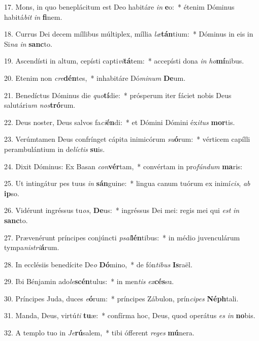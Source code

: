 17. Mons, in quo beneplácitum est Deo habitáre \textit{in} \textbf{e}o:~*  étenim Dóminus habitá\textit{bit} \textit{in} \textbf{fi}nem.\

18. Currus Dei decem míllibus múltiplex, míllia \textit{læ}\textbf{tán}tium:~*  Dóminus in eis in Si\textit{na} \textit{in} \textbf{sanc}to.\

19. Ascendísti in altum, cepísti capti\textit{vi}\textbf{tá}tem:~*  accepísti dona \textit{in} \textit{ho}\textbf{mí}nibus.\

20. Etenim non \textit{cre}\textbf{dén}tes,~*  inhabitáre Dó\textit{mi}\textit{num} \textbf{De}um.\

21. Benedíctus Dóminus die \textit{quo}\textbf{tí}die:~*  prósperum iter fáciet nobis Deus salutári\textit{um} \textit{nos}\textbf{tró}rum.\

22. Deus noster, Deus salvos fa\textit{ci}\textbf{én}di:~*  et Dómini Dómini éx\textit{i}\textit{tus} \textbf{mor}tis.\

23. Verúmtamen Deus confrínget cápita inimicórum \textit{su}\textbf{ó}rum:~*  vérticem capílli perambulántium in de\textit{líc}\textit{tis} \textbf{su}is.\

24. Dixit Dóminus: Ex Basan \textit{con}\textbf{vér}tam,~*  convértam in pro\textit{fún}\textit{dum} \textbf{ma}ris:\

25. Ut intingátur pes tuus \textit{in} \textbf{sán}guine:~*  lingua canum tuórum ex inimí\textit{cis}, \textit{ab} \textbf{ip}so.\

26. Vidérunt ingréssus tu\textit{os}, \textbf{De}us:~*  ingréssus Dei mei: regis mei qui \textit{est} \textit{in} \textbf{sanc}to.\

27. Prævenérunt príncipes conjúncti \textit{psal}\textbf{lén}tibus:~*  in médio juvenculárum tympa\textit{nis}\textit{tri}\textbf{á}rum.\

28. In ecclésiis benedícite De\textit{o} \textbf{Dó}mino,~*  de fón\textit{ti}\textit{bus} \textbf{Is}raël.\

29. Ibi Bénjamin ado\textit{le}\textbf{scén}tulus:~*  in men\textit{tis} \textit{ex}\textbf{cés}su.\

30. Príncipes Juda, duces \textit{e}\textbf{ó}rum:~*  príncipes Zábulon, prín\textit{ci}\textit{pes} \textbf{Néph}tali.\

31. Manda, Deus, virtú\textit{ti} \textbf{tu}æ:~*  confírma hoc, Deus, quod operátus \textit{es} \textit{in} \textbf{no}bis.\

32. A templo tuo in \textit{Je}\textbf{rú}salem,~*  tibi ófferent \textit{re}\textit{ges} \textbf{mú}nera.\

